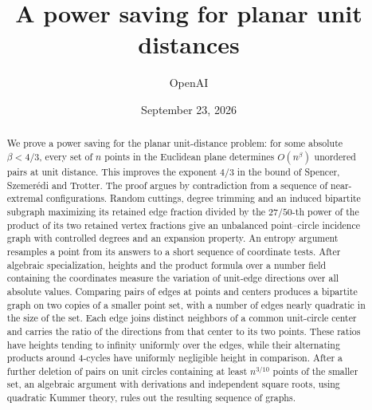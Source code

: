 \documentclass[11pt]{article}
\title{A power saving for planar unit distances}
\author{OpenAI}
\date{September 23, 2026}
\theoremstyle{definition}
\newcommand{\1}{\mathbf 1}
\numberwithin{equation}{section}
\begin{document}
\maketitle
\begin{abstract}
We prove a power saving for the planar unit-distance problem: for some absolute \(\beta<4/3\), every set of \(n\) points in the Euclidean plane determines \(O(n^\beta)\) unordered pairs at unit distance. This improves the exponent \(4/3\) in the bound of Spencer, Szemer\'edi and Trotter. The proof argues by contradiction from a sequence of near-extremal configurations. Random cuttings, degree trimming and an induced bipartite subgraph maximizing its retained edge fraction divided by the \(27/50\)-th power of the product of its two retained vertex fractions give an unbalanced point--circle incidence graph with controlled degrees and an expansion property. An entropy argument resamples a point from its answers to a short sequence of coordinate tests. After algebraic specialization, heights and the product formula over a number field containing the coordinates measure the variation of unit-edge directions over all absolute values. Comparing pairs of edges at points and centers produces a bipartite graph on two copies of a smaller point set, with a number of edges nearly quadratic in the size of the set. Each edge joins distinct neighbors of a common unit-circle center and carries the ratio of the directions from that center to its two points. These ratios have heights tending to infinity uniformly over the edges, while their alternating products around 4-cycles have uniformly negligible height in comparison. After a further deletion of pairs on unit circles containing at least \(n^{3/10}\) points of the smaller set, an algebraic argument with derivations and independent square roots, using quadratic Kummer theory, rules out the resulting sequence of graphs.
\end{abstract}










\end{document}
